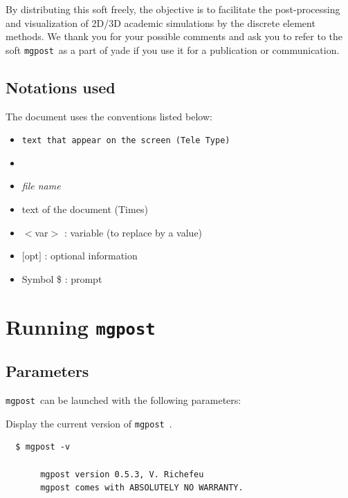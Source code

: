 \documentclass{simpledoc}
\newcommand{\mgpost}{\texttt{mgpost}\ }
\newcommand{\var}[1]{$<$#1$>$}
\newcommand{\opt}[1]{$[$#1$]$}
\newcommand{\file}[1]{\textit{#1}}
\newcommand{\screen}[1]{\texttt{#1}}
\newcommand{\key}[1]{\fbox{#1}}
\begin{document}
\attention
By distributing this soft freely, the objective is to facilitate the 
post-processing and visualization of 2D/3D academic simulations 
by the discrete element methods. We thank you for your possible comments and ask you to refer to 
the soft \mgpost as a part of yade if you use it for a publication or communication.

\subsection{Notations used}

The document uses the conventions listed below:

\begin{itemize}

\item \screen{text that appear on the screen (Tele Type)}

\item \key{key}

\item \file{file name}

\item \textnormal{text of the document (Times)}

\item \var{var} : variable (to replace by a value)

\item \opt{opt} : optional information

\item Symbol \$ : prompt

\end{itemize}

\section {Running \mgpost}

\subsection {Parameters}

\mgpost can be launched with the following parameters:

Display the current version of \mgpost.

\begin{verbatim}
  $ mgpost -v

       mgpost version 0.5.3, V. Richefeu
       mgpost comes with ABSOLUTELY NO WARRANTY.
\end{verbatim}
\end{document}
